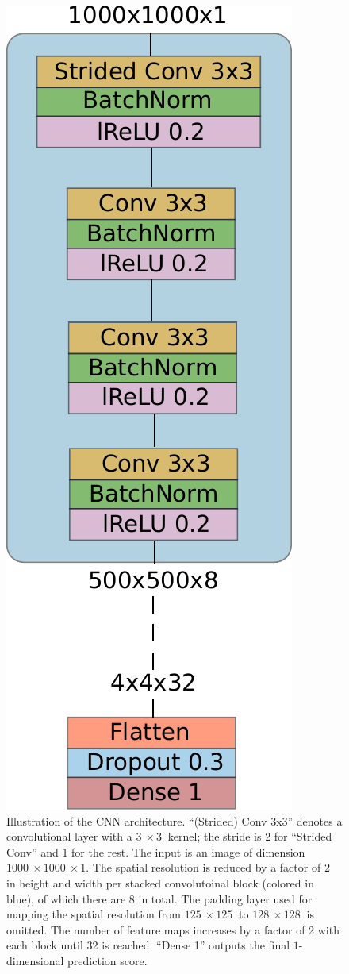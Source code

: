 \documentclass[10pt,conference,compsocconf]{IEEEtran}
\begin{document}
\begin{figure}
    \centering
    \includegraphics[width=0.35\columnwidth]{assets/nn_classifier_arch.pdf}
    \caption{Illustration of the CNN architecture. ``(Strided) Conv 3x3'' denotes a convolutional layer with a $\SI{3}{}\times\SI{3}{}$ kernel; the stride is \SI{2}{} for ``Strided Conv'' and \SI{1}{} for the rest.
    The input is an image of dimension $\SI{1000}{}\times\SI{1000}{}\times1$. The spatial resolution is reduced by a factor of \SI{2}{} in height and width per stacked convolutoinal block (colored in blue), of which there are 8 in total. The padding layer used for mapping the spatial resolution from $\SI{125}{}\times\SI{125}{}$ to $\SI{128}{}\times\SI{128}{}$ is omitted. The number of feature maps increases by a factor of \SI{2}{} with each block until \SI{32}{} is reached. ``Dense 1'' outputs the final $1$-dimensional prediction score.} %
    \label{fig:nn_classifier_arch}
\end{figure}

\end{document}
